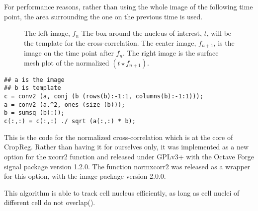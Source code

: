     For performance reasons, rather than using the whole image of the following time point, the area surrounding
    the one on the previous time is used.
    
    \begin{figure}
      \centering
                   {The left image, $f_n$
                    The box around the nucleus of interest, $t$, will be the template for the cross-correlation.
                    The center image, $f_{n+1}$, is the image on the time point after $f_n$. The right image is
                    the surface mesh plot of the normalized $(t \star f_{n+1})$.}
      \label{fig:normxcorr2}
    \end{figure}
    
    
    
    \begin{verbatim}
## a is the image
## b is template
c = conv2 (a, conj (b (rows(b):-1:1, columns(b):-1:1))); 
a = conv2 (a.^2, ones (size (b)));
b = sumsq (b(:));
c(:,:) = c(:,:) ./ sqrt (a(:,:) * b);
\end{verbatim}
    
    This is the code for the normalized cross-correlation which is at the core of CropReg. Rather than having
    it for ourselves only, it was implemented as a new option for the xcorr2 function and released under GPLv3+ with
    the Octave Forge signal package version 1.2.0. The function normxcorr2 was released as a wrapper for
    this option, with the image package version 2.0.0.
    
    This algorithm is able to track cell nucleus efficiently, as long as cell nuclei of different cell do not
    overlap().
    
